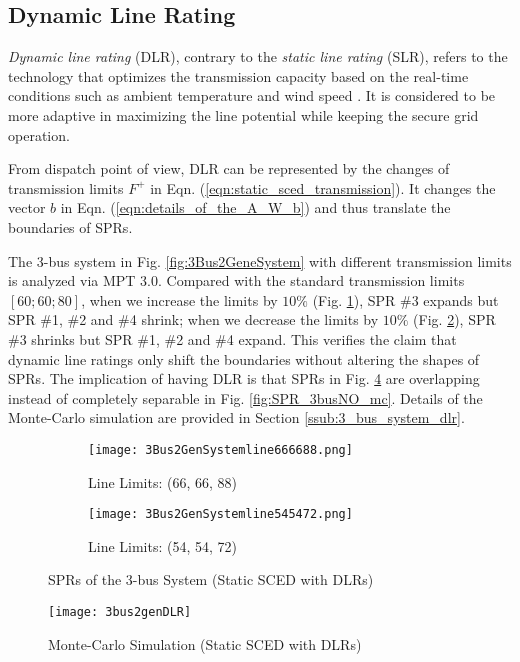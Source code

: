 \documentclass[letterpaper, 11pt]{article}
\theoremstyle{plain}
\theoremstyle{definition}
\begin{document}
\subsection{Dynamic Line Rating} \label{sub:dynamic_line_rating}
\emph{Dynamic line rating} (DLR), contrary to the \emph{static line rating} (SLR),  refers to the technology that optimizes the transmission capacity based on the real-time conditions such as ambient temperature and wind speed \cite{douglass1996real}.
It is considered to be more adaptive in maximizing the line potential while keeping the secure grid operation.

From dispatch point of view, DLR can be represented by the changes of transmission limits $F^+$ in Eqn. (\ref{eqn:static_sced_transmission}). It changes the vector $b$ in Eqn. (\ref{eqn:details_of_the_A_W_b}) and thus translate the boundaries of SPRs.

The 3-bus system in Fig. \ref{fig:3Bus2GeneSystem} with different transmission limits is analyzed via MPT 3.0. Compared with the standard transmission limits $[60;60;80]$, when we increase the limits by $10\%$ (Fig. \ref{fig:line_11}), SPR \#3 expands but SPR \#1, \#2 and \#4 shrink; when we decrease the limits by $10\%$ (Fig. \ref{fig:line_09}), SPR \#3 shrinks but SPR \#1, \#2 and \#4 expand.
This verifies the claim that dynamic line ratings only shift the boundaries without altering the shapes of SPRs. 
The implication of having DLR is that SPRs in Fig. \ref{fig:spr_3bus_dlr_mc} are overlapping instead of completely separable in Fig. \ref{fig:SPR_3busNO_mc}. Details of the Monte-Carlo simulation are provided in Section \ref{ssub:3_bus_system_dlr}.

\begin{figure}[htbp]
  \centering
\begin{subfigure}[t]{0.49\linewidth}
  \centering
  \texttt{[image: 3Bus2GenSystemline666688.png]} 
  \caption{Line Limits: (66, 66, 88)}
  \label{fig:line_11}
  \end{subfigure}
  \begin{subfigure}[t]{0.49\linewidth}
  \centering
  \texttt{[image: 3Bus2GenSystemline545472.png]} 
  \caption{Line Limits: (54, 54, 72)}
  \label{fig:line_09}
  \end{subfigure}  
\caption{SPRs of the 3-bus System (Static SCED with DLRs)}
  \label{fig:SPR_3bus_dlr}
\end{figure}

\begin{figure}[htbp]
  \centering
  \texttt{[image: 3bus2genDLR]}
  \caption{Monte-Carlo Simulation (Static SCED with DLRs)}
  \label{fig:spr_3bus_dlr_mc}
\end{figure}
\end{document}
